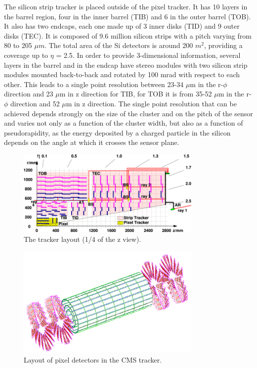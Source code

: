 The silicon strip tracker is placed outside of the pixel tracker. It has 10 layers in the barrel region, four in the inner barrel (TIB) and 6 in the outer barrel (TOB). It also has two endcaps, each one made up of 3 inner disks (TID) and 9 outer disks (TEC). It is composed of 9.6 million silicon strips with a pitch varying from 80 to 205 $\mu m$. The total area of the Si detectors is around 200 $m^{2}$, providing a coverage up to $\eta$ = 2.5. In order to provide 3-dimensional information, several layers in the barrel and in the endcap have stereo modules with two silicon strip modules mounted back-to-back and rotated by 100 mrad with respect to each other.
This leads to a single point resolution between 23-34 $\mu$m in the r-$\phi$ direction and 23 $\mu$m in z direction for TIB, for TOB it is from 35-52 $\mu$m in the r-$\phi$ direction and 52 $\mu$m in z direction. The single point resolution that can be achieved depends strongly on the size of the cluster and on the pitch of the sensor and varies not only as a function of the cluster width, but also as a function of pseudorapidity, as the energy deposited by a charged particle in the silicon depends on the angle at which it crosses the sensor plane.
\begin{figure}[h!]
\begin{center}
\includegraphics[width=0.8\textwidth]{figures/CMS/tracker/cms_tracker.png}
\caption{The tracker layout (1/4 of the z view).}
\label{fig:CMS_tracker}
\end{center}
\end{figure}

\begin{figure}[h!]
\begin{center}
\includegraphics[width=0.8\textwidth]{figures/CMS/tracker/cms_pixelDetector.png}
\caption{Layout of pixel detectors in the CMS tracker.}
\label{fig:CMS_pixel_detector}
\end{center}
\end{figure}

